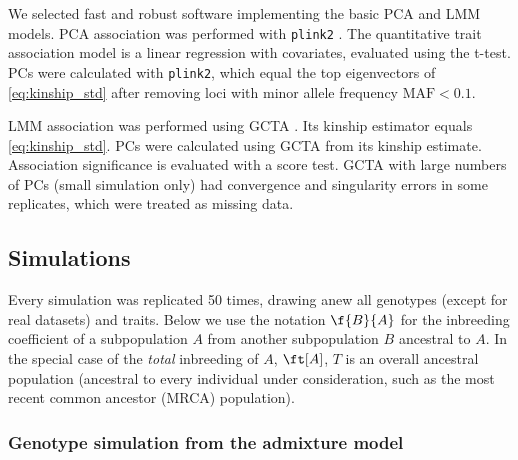 \documentclass[11pt]{article}
\begin{document}
\begin{linenumbers}
We selected fast and robust software implementing the basic PCA and LMM models.
PCA association was performed with \texttt{plink2} \citep{chang_second-generation_2015}.
The quantitative trait association model is a linear regression with covariates, evaluated using the t-test.
PCs were calculated with \texttt{plink2}, which equal the top eigenvectors of \cref{eq:kinship_std} after removing loci with minor allele frequency $\text{MAF} < 0.1$.

LMM association was performed using GCTA \citep{yang_gcta:_2011,yang_advantages_2014}.
Its kinship estimator equals \cref{eq:kinship_std}.
PCs were calculated using GCTA from its kinship estimate.
Association significance is evaluated with a score test.
GCTA with large numbers of PCs (small simulation only) had convergence and singularity errors in some replicates, which were treated as missing data.

\subsection{Simulations}

Every simulation was replicated 50 times, drawing anew all genotypes (except for real datasets) and traits.
Below we use the notation $\f{B}{A}$ for the inbreeding coefficient of a subpopulation $A$ from another subpopulation $B$ ancestral to $A$.
In the special case of the \textit{total} inbreeding of $A$, $\ft[A]$, $T$ is an overall ancestral population (ancestral to every individual under consideration, such as the most recent common ancestor (MRCA) population).

\subsubsection{Genotype simulation from the admixture model}


\end{linenumbers}
\end{document}
